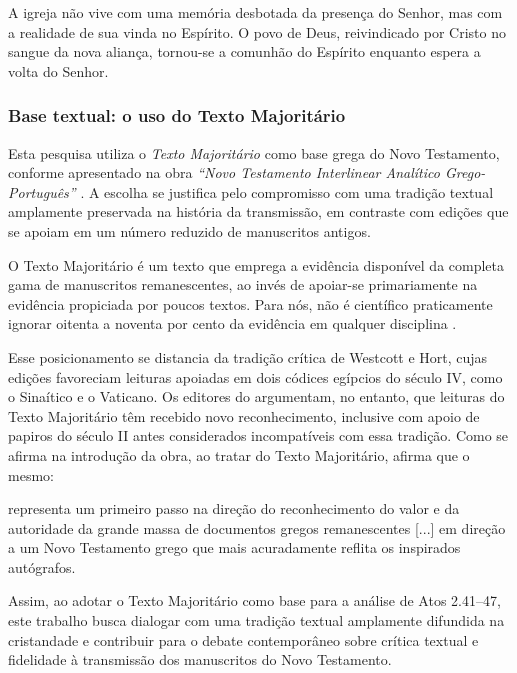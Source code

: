 \begin{citacao}
    A igreja não vive com uma memória desbotada da presença do Senhor, mas com a realidade de sua vinda no Espírito. O povo de Deus, reivindicado por Cristo no sangue da nova aliança, tornou-se a comunhão do Espírito enquanto espera a volta do Senhor. \cite[p.~46]{clowney2007}
\end{citacao}

\subsubsection{Base textual: o uso do Texto Majoritário}

Esta pesquisa utiliza o \textit{Texto Majoritário} como base grega do Novo Testamento, conforme apresentado na obra \textit{``Novo Testamento Interlinear Analítico Grego-Português''} \cite{interlinear2008}. A escolha se justifica pelo compromisso com uma tradição textual amplamente preservada na história da transmissão, em contraste com edições que se apoiam em um número reduzido de manuscritos antigos.

\begin{citacao}
    O Texto Majoritário é um texto que emprega a evidência disponível da completa gama de manuscritos remanescentes, ao invés de apoiar-se primariamente na evidência propiciada por poucos textos. Para nós, não é científico praticamente ignorar oitenta a noventa por cento da evidência em qualquer disciplina \cite[p.~ix]{interlinear2008}.
\end{citacao}

Esse posicionamento se distancia da tradição crítica de Westcott e Hort, cujas edições favoreciam leituras apoiadas em dois códices egípcios do século IV, como o Sinaítico e o Vaticano. Os editores do  argumentam, no entanto, que leituras do Texto Majoritário têm recebido novo reconhecimento, inclusive com apoio de papiros do século II antes considerados incompatíveis com essa tradição. Como se afirma na introdução da obra, ao tratar do Texto Majoritário, afirma que o mesmo:

\begin{citacao}
    representa um primeiro passo na direção do reconhecimento do valor e da autoridade da grande massa de documentos gregos remanescentes [...] em direção a um Novo Testamento grego que mais acuradamente reflita os inspirados autógrafos. \cite[p.~xiii]{interlinear2008}
\end{citacao}

Assim, ao adotar o Texto Majoritário como base para a análise de Atos 2.41–47, este trabalho busca dialogar com uma tradição textual amplamente difundida na cristandade e contribuir para o debate contemporâneo sobre crítica textual e fidelidade à transmissão dos manuscritos do Novo Testamento.

